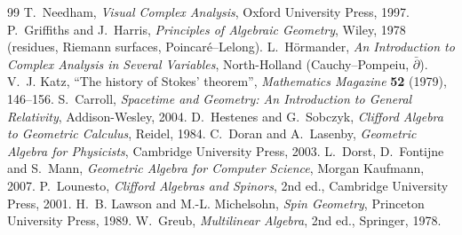 \begin{thebibliography}{99}
 T.~Needham, \emph{Visual Complex Analysis}, Oxford University Press, 1997.
 P.~Griffiths and J.~Harris, \emph{Principles of Algebraic Geometry}, Wiley, 1978 (residues, Riemann surfaces, Poincar\'e--Lelong).
 L.~H\"ormander, \emph{An Introduction to Complex Analysis in Several Variables}, North-Holland (Cauchy--Pompeiu, $\bar\partial$).
 V.~J. Katz, ``The history of Stokes' theorem'', \emph{Mathematics Magazine} \textbf{52} (1979), 146--156.
 S.~Carroll, \emph{Spacetime and Geometry: An Introduction to General Relativity}, Addison-Wesley, 2004.
 D.~Hestenes and G.~Sobczyk, \emph{Clifford Algebra to Geometric Calculus}, Reidel, 1984.
 C.~Doran and A.~Lasenby, \emph{Geometric Algebra for Physicists}, Cambridge University Press, 2003.
 L.~Dorst, D.~Fontijne and S.~Mann, \emph{Geometric Algebra for Computer Science}, Morgan Kaufmann, 2007.
 P.~Lounesto, \emph{Clifford Algebras and Spinors}, 2nd ed., Cambridge University Press, 2001.
 H.~B. Lawson and M.-L. Michelsohn, \emph{Spin Geometry}, Princeton University Press, 1989.
 W.~Greub, \emph{Multilinear Algebra}, 2nd ed., Springer, 1978.
\end{thebibliography}
